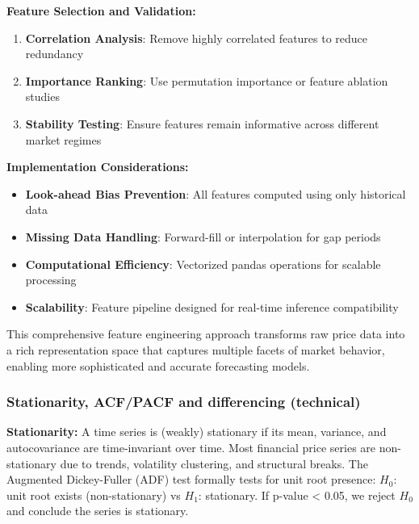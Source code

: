 \documentclass[conference]{IEEEtran}
\begin{document}
\textbf{Feature Selection and Validation:}
\begin{enumerate}
  \item \textbf{Correlation Analysis}: Remove highly correlated features to reduce redundancy
  \item \textbf{Importance Ranking}: Use permutation importance or feature ablation studies
  \item \textbf{Stability Testing}: Ensure features remain informative across different market regimes
\end{enumerate}

\textbf{Implementation Considerations:}
\begin{itemize}
  \item \textbf{Look-ahead Bias Prevention}: All features computed using only historical data
  \item \textbf{Missing Data Handling}: Forward-fill or interpolation for gap periods
  \item \textbf{Computational Efficiency}: Vectorized pandas operations for scalable processing
  \item \textbf{Scalability}: Feature pipeline designed for real-time inference compatibility
\end{itemize}

This comprehensive feature engineering approach transforms raw price data into a rich representation space that captures multiple facets of market behavior, enabling more sophisticated and accurate forecasting models.

\subsubsection{Stationarity, ACF/PACF and differencing (technical)}
\textbf{Stationarity:} A time series is (weakly) stationary if its mean, variance, and autocovariance are time-invariant over time. Most financial price series are non-stationary due to trends, volatility clustering, and structural breaks. The Augmented Dickey-Fuller (ADF) test formally tests for unit root presence: $H_0$: unit root exists (non-stationary) vs $H_1$: stationary. If p-value < 0.05, we reject $H_0$ and conclude the series is stationary.
\end{document}
